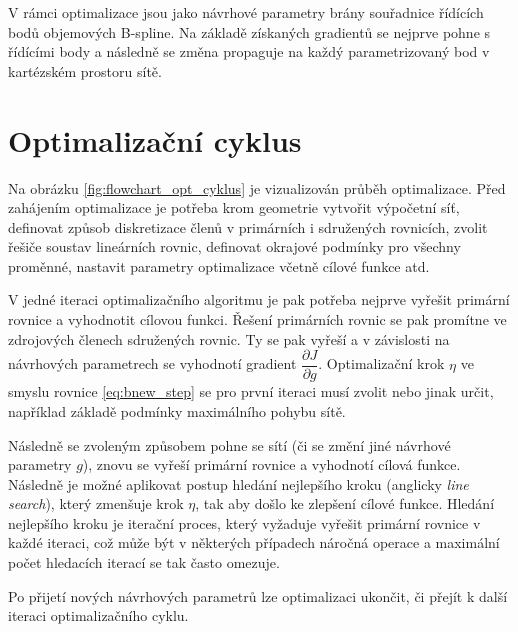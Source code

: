 V rámci optimalizace jsou jako návrhové parametry brány souřadnice řídících bodů objemových B-spline. Na základě získaných gradientů se nejprve pohne s řídícími body a následně se změna propaguje na každý parametrizovaný bod v kartézském prostoru sítě.



\section{Optimalizační cyklus}

Na obrázku \ref{fig:flowchart_opt_cyklus} je vizualizován průběh optimalizace. Před zahájením optimalizace je potřeba krom geometrie vytvořit výpočetní síť, definovat způsob diskretizace členů v primárních i sdružených rovnicích, zvolit řešiče soustav lineárních rovnic, definovat okrajové podmínky pro všechny proměnné, nastavit parametry optimalizace včetně cílové funkce atd. 

V jedné iteraci optimalizačního algoritmu je pak potřeba nejprve vyřešit primární rovnice a vyhodnotit cílovou funkci. Řešení primárních rovnic se pak promítne ve zdrojových členech sdružených rovnic. Ty se pak vyřeší a v závislosti na návrhových parametrech se vyhodnotí gradient $ \dfrac{\partial J}{\partial g} $. Optimalizační krok $ \eta $ ve smyslu rovnice \ref{eq:bnew_step} se pro první iteraci musí zvolit nebo jinak určit, například základě podmínky maximálního pohybu sítě.

Následně se zvoleným způsobem pohne se sítí (či se změní jiné návrhové parametry $ g $), znovu se vyřeší primární rovnice a vyhodnotí cílová funkce. Následně je možné aplikovat postup hledání nejlepšího kroku (anglicky \textit{line search}), který zmenšuje krok $ \eta $, tak aby došlo ke zlepšení cílové funkce. Hledání nejlepšího kroku je iterační proces, který vyžaduje vyřešit primární rovnice v každé iteraci, což může být v některých případech náročná operace a maximální počet hledacích iterací se tak často omezuje.

Po přijetí nových návrhových parametrů lze optimalizaci ukončit, či přejít k další iteraci optimalizačního cyklu.

